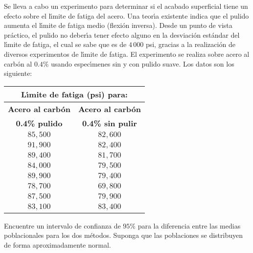 \begin{enunciado}
 Se lleva a cabo un experimento para determinar si el acabado superficial tiene un efecto sobre el l\'{\i}mite de fatiga del acero. Una teor\'{\i}a existente indica que el pulido aumenta el l\'{\i}mite de fatiga medio (flexi\'on inversa). Desde un punto de vista pr\'actico, el pulido no deber\'{\i}a tener efecto alguno en la desviaci\'on est\'andar del l\'{\i}mite de fatiga, el cual se sabe que es de $4\,000$ psi, gracias a la realizaci\'on de diversos experimentos de l\'{\i}mite de fatiga. El experimento se realiza sobre acero al carb\'on al $0.4\%$ usando espec\'{\i}menes sin y con pulido suave. Los datos son los siguiente:
 \begin{center}
  \begin{tabular}{cc}
   \multicolumn{2}{c}{\textbf{L\'{\i}mite de fatiga (psi) para:}} \\
   \hline 
   \textbf{Acero al carb\'on} & \textbf{Acero al carb\'on} \\
   \textbf{0.4\% pulido} & \textbf{0.4\% sin pulir} \\
   \hline 
   $85,500$ & $82,600$ \\
   $91,900$ & $82,400$ \\
   $89,400$ & $81,700$ \\
   $84,000$ & $79,500$ \\
   $89,900$ & $79,400$ \\
   $78,700$ & $69,800$ \\
   $87,500$ & $79,900$ \\
   $83,100$ & $83,400$
  \end{tabular}
 \end{center}
 Encuentre un intervalo de confianza de $95\%$ para la diferencia entre las medias poblacionales para los dos m\'etodos. Suponga que las poblaciones se distribuyen de forma aproximadamente normal.
\end{enunciado}

